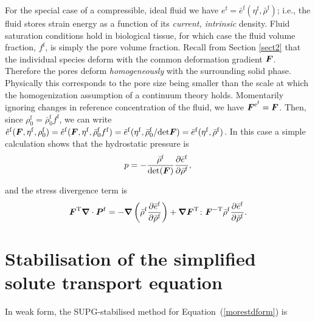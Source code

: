 For the special case of a compressible, ideal fluid we have
$e^\mathrm{f} =
\bar{e}^\mathrm{f}(\eta^\mathrm{f},\bar{\rho}^\mathrm{f})$; i.e.,
the fluid stores strain energy as a function of its \emph{current,
intrinsic} density. Fluid saturation conditions hold in biological
tissue, for which case the fluid volume fraction, $f^\mathrm{f}$,
is simply the pore volume fraction. Recall from Section
\ref{sect2} that the individual species deform with the common
deformation gradient $\mbox{\boldmath$ F$}$. Therefore the pores deform
\emph{homogeneously} with the surrounding solid phase. Physically
this corresponds to the pore size being smaller than the scale at
which the homogenization assumption of a continuum theory holds.
Momentarily ignoring changes in reference concentration of the
fluid, we have $\mbox{\boldmath$ F$}^{\mathrm{e}^\mathrm{f}} = \mbox{\boldmath$ F$}$.  Then, since
$\rho^\mathrm{f}_0 = \bar{\rho}^\mathrm{f}_0 f^\mathrm{f}$, we can
write $\hat{e}^\mathrm{f}(\mbox{\boldmath$ F$},\eta^\mathrm{f},\rho^\mathrm{f}_0) =
\hat{e}^\mathrm{f}(\mbox{\boldmath$ F$},\eta^\mathrm{f},\bar{\rho}^\mathrm{f}_0
f^\mathrm{f}) =
\bar{e}^\mathrm{f}(\eta^\mathrm{f},\bar{\rho}^\mathrm{f}_0/\mathrm{det}\mbox{\boldmath$ F$})=
\bar{e}^\mathrm{f}(\eta^\mathrm{f},\bar{\rho}^\mathrm{f})$. In
this case a simple calculation shows that the hydrostatic pressure
is
\begin{displaymath}
p =
-\frac{\bar{\rho}^\mathrm{f}}{\mathrm{det}(\mbox{\boldmath$ F$})}\frac{\partial\bar{e}^\mathrm{f}}{\partial\bar{\rho}^\mathrm{f}},
\end{displaymath}

\noindent and the stress divergence term is
\begin{displaymath}
\mbox{\boldmath$ F$}^\mathrm{T}\mbox{\boldmath$\nabla$}\cdot\mbox{\boldmath$ P$}^\mathrm{f} =
-\mbox{\boldmath$\nabla$}\left(\bar{\rho}^\mathrm{f}\frac{\partial\bar{e}^\mathrm{f}}{\partial\bar{\rho}^\mathrm{f}}\right)
+
\mbox{\boldmath$\nabla$}\mbox{\boldmath$ F$}^\mathrm{T}\colon\mbox{\boldmath$ F$}^{-\mathrm{T}}\bar{\rho}^\mathrm{f}\frac{\partial\bar{e}^\mathrm{f}}{\partial\bar{\rho}^\mathrm{f}}.
\end{displaymath}

\section{Stabilisation of the simplified solute transport equation}
\label{stabilisation-solute-transport}

In weak form, the SUPG-stabilised method for
Equation~(\ref{morestdform}) is

